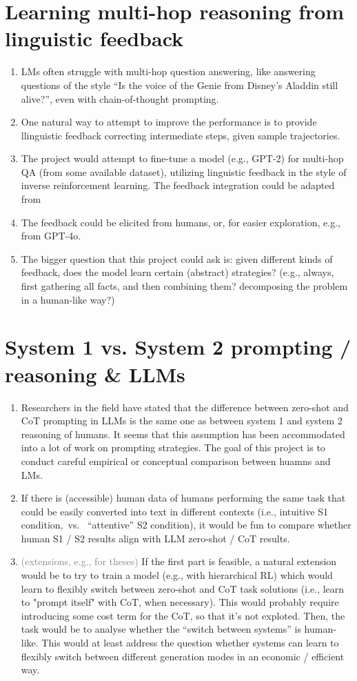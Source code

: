\documentclass[fleqn,reqno,10pt]{article}
\begin{document}
\section{Learning multi-hop reasoning from linguistic feedback}
\begin{enumerate}
	\item LMs often struggle with multi-hop question answering, like answering questions of the style ``Is the voice of the Genie from Disney’s Aladdin still alive?'', even with chain-of-thought prompting.
	\item One natural way to attempt to improve the performance is to provide llinguistic feedback correcting intermediate steps, given sample trajectories.
	\item The project would attempt to fine-tune a model (e.g., GPT-2) for multi-hop QA (from some available dataset), utilizing linguistic feedback in the style of inverse reinforcement learning. The feedback integration could be adapted from \citep{sumers2021learning}
	\item The feedback could be elicited from humans, or, for easier exploration, e.g., from GPT-4o.
	\item The bigger question that this project could ask is: given different kinds of feedback, does the model learn certain (abstract) strategies? (e.g., always, first gathering all facts, and then combining them? decomposing the problem in a human-like way?)
\end{enumerate}

\section{System 1 vs. System 2 prompting / reasoning \& LLMs}
\begin{enumerate}
	\item Researchers in the field have stated that the difference between zero-shot and CoT prompting in LLMs is the same one as between system 1 and system 2 reasoning of humans.  It seems that this assumption has been accommodated into a lot of work on prompting strategies. The goal of this project is to conduct careful empirical or conceptual comparison between huamns and LMs.
	\item If there is (accessible) human data of humans performing the same task that could be easily converted into text in different contexts (i.e., intuitive S1 condition,~vs.~ ``attentive'' S2 condition), it would be fun to compare whether human S1 / S2 results align with LLM zero-shot / CoT results.
	\item \textcolor{gray}{(extensions, e.g., for theses)} If the first part is feasible, a natural extension would be to try to train a model (e.g., with hierarchical RL) which would learn to flexibly switch between zero-shot and CoT task solutions (i.e., learn to "prompt itself" with CoT, when necessary). This would probably require introducing some cost term for the CoT, so that it's not exploted. Then, the task would be to analyse whether the ``switch between systems'' is human-like.  This would at least address the question whether systems can learn to flexibly switch between different generation modes in an economic / efficient way.
\end{enumerate}
\end{document}
